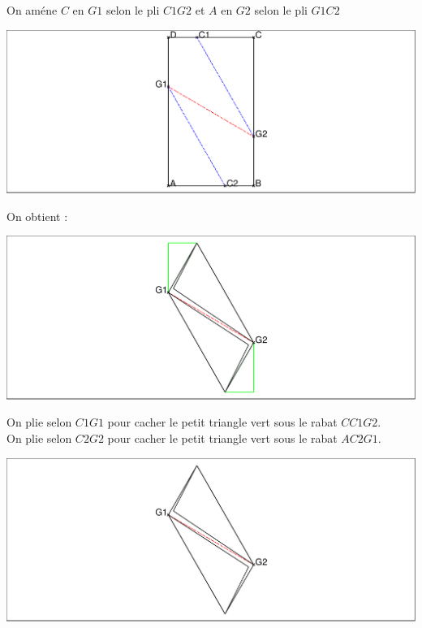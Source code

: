 \documentclass[a4paper,11pt]{book}
\begin{document}
\noindent
\begin{minipage}[h]{7cm}
On am\'ene $C$ en $G1$ selon le pli $C1G2$ et
$A$ en $G2$ selon le pli $G1C2$
\end{minipage}
\hspace{0.5cm}
\begin{minipage}[h]{7cm}
\includegraphics[width=\textwidth]{pli2}
\end{minipage}

\noindent
\begin{minipage}[h]{7cm}
On obtient :
\end{minipage}
\hspace{0.5cm}
\begin{minipage}[h]{7cm}
\includegraphics[width=\textwidth]{pli3}
\end{minipage}

\noindent
\begin{minipage}[h]{7cm}
On plie selon $C1G1$ pour cacher le petit triangle vert sous le rabat $CC1G2$.\\
On plie selon $C2G2$ pour cacher le petit triangle vert sous le rabat $AC2G1$.
\end{minipage}
\hspace{0.5cm}
\begin{minipage}[h]{7cm}
\includegraphics[width=\textwidth]{pli4}
\end{minipage}
\end{document}
